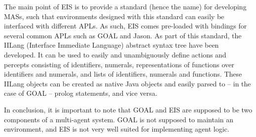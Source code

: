The main point of EIS is to provide a standard (hence the name) for
developing MASs, such that environments designed with this standard
can easily be interfaced with different APLs. As such, EIS comes pre-loaded
with bindings for several common APLs such as GOAL and Jason. As part
of this standard, the IILang (Interface Immediate Language) abstract
syntax tree have been developed. It can be used to easily and unambiguously
define actions and percepts consisting of identifiers, numerals, representations
of functions over identifiers and numerals, and lists of identifiers,
numerals and functions. These IILang objects can be created as native
Java objects and easily parsed to -- in the case of GOAL -- prolog
statements, and vice versa.

In conclusion, it is important to note that GOAL and EIS are supposed
to be two components of a multi-agent system. GOAL is not supposed
to maintain an environment, and EIS is not very well suited for implementing
agent logic.
